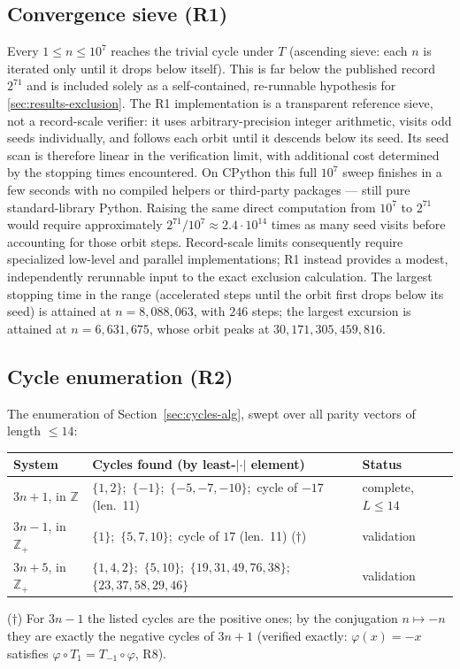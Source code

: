 \documentclass[11pt]{amsart}
\theoremstyle{definition}
\theoremstyle{remark}
\newcommand{\Z}{\mathbb{Z}}
\begin{document}
\subsection{Convergence sieve (R1)}\label{sec:results-sieve}
Every $1 \le n \le 10^7$ reaches the trivial cycle under $T$ (ascending sieve: each $n$ is iterated only until it drops below itself). This is far below the published record $2^{71}$ \cite{barina2025} and is included solely as a self-contained, re-runnable hypothesis for \ref{sec:results-exclusion}. The R1 implementation is a transparent reference sieve, not a record-scale verifier: it uses arbitrary-precision integer arithmetic, visits odd seeds individually, and follows each orbit until it descends below its seed. Its seed scan is therefore linear in the verification limit, with additional cost determined by the stopping times encountered. On CPython this full $10^7$ sweep finishes in a few seconds with no compiled helpers or third-party packages --- still pure standard-library Python. Raising the same direct computation from $10^7$ to $2^{71}$ would require approximately $2^{71}/10^7 \approx 2.4\cdot10^{14}$ times as many seed visits before accounting for those orbit steps. Record-scale limits consequently require specialized low-level and parallel implementations; R1 instead provides a modest, independently rerunnable input to the exact exclusion calculation. The largest stopping time in the range (accelerated steps until the orbit first drops below its seed) is attained at $n = 8{,}088{,}063$, with $246$ steps; the largest excursion is attained at $n = 6{,}631{,}675$, whose orbit peaks at $30{,}171{,}305{,}459{,}816$.

\subsection{Cycle enumeration (R2)}\label{sec:results-cycles}
The enumeration of Section~\ref{sec:cycles-alg}, swept over all parity vectors of length $\le 14$:
\begin{center}\footnotesize
\setlength{\tabcolsep}{2.5pt}%
\begin{tabular}{lll}
\toprule
System & Cycles found (by least-$|\cdot|$ element) & Status \\
\midrule
$3n+1$, in $\Z$ & $\{1,2\}$;\ $\{-1\}$;\ $\{-5,-7,-10\}$;\ cycle of $-17$ (len.\ 11) & complete, $L \le 14$ \\
$3n-1$, in $\Z_+$ & $\{1\}$;\ $\{5,7,10\}$;\ cycle of $17$ (len.\ 11) ($\dagger$) & validation \\
$3n+5$, in $\Z_+$ & $\{1,4,2\}$;\ $\{5,10\}$;\ $\{19,31,49,76,38\}$;\ $\{23,37,58,29,46\}$ & validation \\
\bottomrule
\end{tabular}
\end{center}
{\small ($\dagger$) For $3n-1$ the listed cycles are the positive ones; by the conjugation $n \mapsto -n$ they are exactly the negative cycles of $3n+1$ (verified exactly: $\varphi(x) = -x$ satisfies $\varphi \circ T_1 = T_{-1} \circ \varphi$, R8).}
\end{document}
